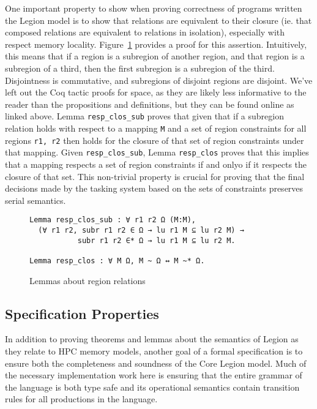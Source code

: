 \documentclass[sigconf]{acmart}
\begin{document}
One important property to show when proving correctness of programs written the
Legion model is to show that relations are equivalent to their closure (ie. that
composed relations are equivalent to relations in isolation), especially with
respect memory locality. Figure~\ref{regionrelproof} provides a proof for this
assertion. Intuitively, this means that if a region is a
subregion of another region, and that region is a subregion of a third, then
the first subregion is a subregion of the third. Disjointness is commutative, 
and subregions of disjoint regions are disjoint. We've left out the Coq tactic
proofs for space, as they are likely less informative to the reader than the
propositions and definitions, but they can be found online as linked above. 
Lemma \texttt{resp\_clos\_sub} proves that given that if a subregion relation
holds with respect to a mapping \texttt{M} and a set of region constraints
 for all regions \texttt{r1, r2} then holds for the closure of that
set of region constraints under that mapping. Given \texttt{resp\_clos\_sub}, 
Lemma \texttt{resp\_clos} proves that this implies that a mapping respects
a set of region constraints if and onlyo if it respects the closure of that
set. This non-trivial property is crucial for proving that the final decisions 
made by the tasking system based on the sets of constraints preserves 
serial semantics. 

\begin{figure}
\centering
\begin{BVerbatim}
Lemma resp_clos_sub : ∀ r1 r2 Ω (M:M), 
  (∀ r1 r2, subr r1 r2 ∈ Ω → lu r1 M ⊆ lu r2 M) → 
           subr r1 r2 ∈* Ω → lu r1 M ⊆ lu r2 M.

Lemma resp_clos : ∀ M Ω, M ~ Ω ↔ M ~* Ω.
\end{BVerbatim}
\caption{Lemmas about region relations}
\label{regionrelproof}
\end{figure}

\subsection{Specification Properties}
In addition to proving theorems and lemmas about the semantics of Legion as
they relate to HPC memory models, another goal of a formal specification is to
ensure both the completeness and soundness of the Core Legion model. Much of
the necessary implementation work here is ensuring that the entire grammar of
the language is both type safe and its operational semantics contain transition
rules for all productions in the language.
\end{document}
